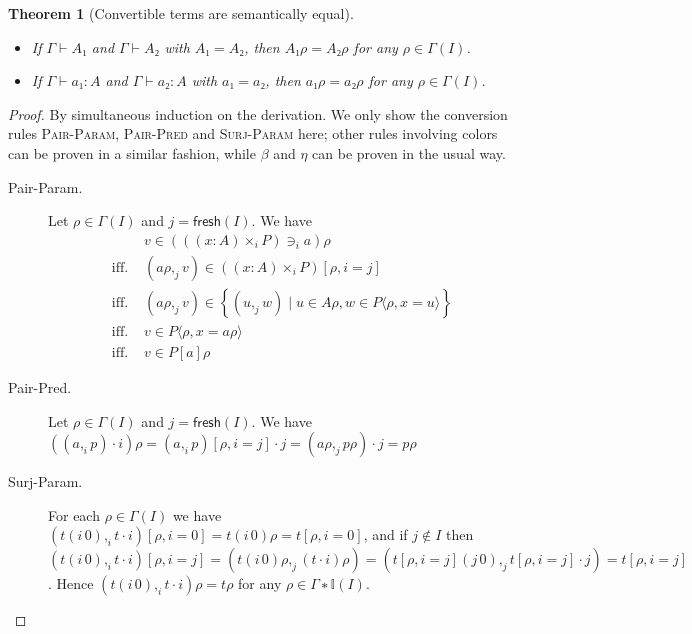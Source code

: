 \documentclass[english]{PaperTools/latex/entcs}
\theoremstyle{plain}
\newtheorem{theorem}{Theorem}
\theoremstyle{definition}
\theoremstyle{remark}
\newcommand\CTimes[2]{(#2) ×_{#1}}
\newcommand\param[1]{\!\cdot\!#1}
\newcommand\op[1]{∋_{#1}}
\def\fresh#1{\mathsf{fresh}(#1)}
\begin{document}
\begin{theorem}[Convertible terms are semantically equal]~
  \label{thm:convertible-in-model}
  \begin{itemize}
    \item If $Γ ⊢ A₁$ and $Γ ⊢ A₂$ with $A₁ = A₂$, then
      $A₁ρ = A₂ρ$ for any $ρ ∈ Γ(I)$.
    \item If $Γ ⊢ a₁ : A$ and $Γ ⊢ a₂ : A$ with $a₁ = a₂$, then
      $a₁ρ = a₂ρ$ for any $ρ ∈ Γ(I)$.
  \end{itemize}
\end{theorem}
\begin{proof}
  By simultaneous induction on the derivation.
  We only show the conversion rules \textsc{Pair-Param},
  \textsc{Pair-Pred} and \textsc{Surj-Param} here; other rules involving
  colors can be proven in a similar fashion, while $β$ and $η$ can be
  proven in the usual way.

  \begin{description}
    \item[\sc Pair-Param.]
      Let $ρ ∈ Γ(I)$ and $j = \fresh I$.  We have
      \begin{align*}
        &v ∈ ({((x:A)\times_i P)} \op {i} a)ρ
        \\
        \text{ iff. }& (aρ ,_j v) ∈ (\CTimes i {x:A} P)[ρ,i=j]
        \\
        \text{ iff. }& (aρ ,_j v) ∈ \left\{ (u ,_j w) \mid u ∈ Aρ, w ∈ P⟨ρ,x=u⟩ \right\}
        \\
        \text{ iff. }& v ∈ P⟨ρ,x=aρ⟩
        \\
        \text{ iff. }& v ∈ P[a]ρ
      \end{align*}

    \item[\sc Pair-Pred.]
      Let $ρ ∈ Γ(I)$ and $j = \fresh I$.  We have
      $ ((a ,_i p) \param i)ρ
      = (a ,_i p)[ρ,i=j]·j
      = (aρ ,_j pρ) · j
      = pρ$

    \item[\sc Surj-Param.]
      For each $ρ ∈ Γ(I)$ we have
      $(t(i\,0) ,_i t·i)[ρ,i=0] = t(i\,0)ρ = t[ρ,i=0]$, and
      if $j ∉ I$ then
      $ (t(i\,0) ,_i t·i)[ρ,i=j]
      = (t(i\,0)ρ ,_j (t·i)ρ)
      = (t[ρ,i=j](j\,0) ,_j t[ρ,i=j]·j)
      = t[ρ,i=j]$.
      Hence $(t(i\,0) ,_i t·i)ρ = tρ$ for any $ρ ∈ Γ∗𝕀(I)$.
      \qedhere
  \end{description}
\end{proof}
\end{document}
